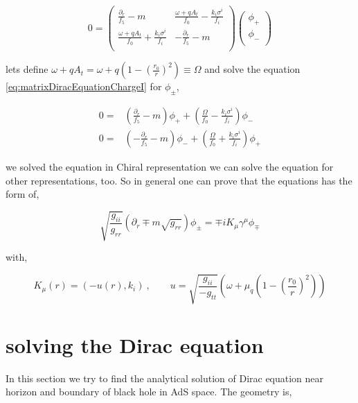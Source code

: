 \begin{equation} \label{eq:matrixDiracEquationChargeI}
   0 = \begin{pmatrix} \frac{\partial_r}{f_5} - m & \frac{\omega + qA_t}{f_0} - \frac{k_i\sigma^i}{f_i} \\ \frac{\omega + qA_t}{f_0} + \frac{k_i\sigma^i}{f_i} & -\frac{\partial_r}{f_5} - m \\ \end{pmatrix} \begin{pmatrix} \phi_{+} \\ \phi_{-} \\ \end{pmatrix}
\end{equation}

lets define $\omega + qA_t = \omega + q(1-(\frac{r_0}{r})^2) \equiv \Omega$ and solve the equation \ref{eq:matrixDiracEquationChargeI} for $\phi_{\pm}$,

\begin{align}
    0 =& \left( \frac{\partial_r}{f_5} - m \right) \phi_{+} + \left( \frac{\Omega}{f_0} - \frac{k_i\sigma^i}{f_i} \right) \phi_{-} \nonumber\\
    0 =& \left( - \frac{\partial_r}{f_5} - m \right) \phi_{-} + \left( \frac{\Omega}{f_0} + \frac{k_i\sigma^i}{f_i} \right) \phi_{+}
\end{align}

we solved the equation in Chiral representation we can solve the equation for other representations, too. So in general one can prove that the equations has the form of,

\begin{equation}
   \sqrt{\frac{g_{ii}}{g_{rr}}} \left(\partial_r\mp m\sqrt{g_{rr}} \right) \phi_{\pm} = \mp i K_{\mu}\gamma^{\mu}\phi_{\mp}
\end{equation}

with,

\begin{equation}
   K_{\mu}(r) = (-u(r),k_i)~, \qquad u = \sqrt{\frac{g_{ii}}{-g_{tt}}}\left(\omega + \mu_q(1-(\frac{r_0}{r})^2)\right)
\end{equation}

\section{solving the Dirac equation}

In this section we try to find the analytical solution of Dirac equation near horizon and boundary of black hole in AdS space. The geometry is,

